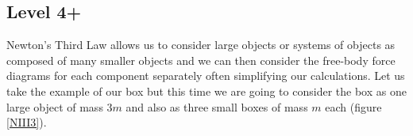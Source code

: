 \subsection{Level 4+}
Newton's Third Law allows us to consider large objects or systems of objects as composed of many smaller objects and we can then consider the free-body force diagrams for each component separately  often simplifying our calculations.\nl
Let us take the example of our box but this time we are going to consider the box as one large object of mass $3m$ and also as three small boxes of mass $m$ each (figure \ref{NIII3}).\nl






